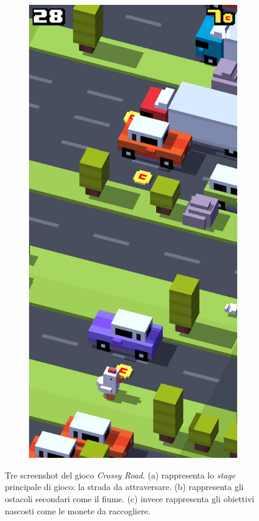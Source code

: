 \documentclass[12pt,a4paper]{report}
\begin{document}
\begin{figure}[bt]
\begin{subfigure}{.32\textwidth}
  \caption{}
  \label{fig:snap2}
\end{subfigure}%
\begin{subfigure}{.32\textwidth}
  \centering
  \includegraphics[width=.95\linewidth]{snapshot_coin}
  \caption{}
  \label{fig:snap3}
\end{subfigure}
\caption{Tre screenshot del gioco \emph{Crossy Road}.
	(a) rappresenta lo \emph{stage} principale di gioco: la strada da attraversare.
	(b) rappresenta gli ostacoli secondari come il fiume.
	(c) invece rappresenta gli obiettivi nascosti come le monete da raccogliere.}
\label{fig:fig}
\end{figure}
\end{document}

